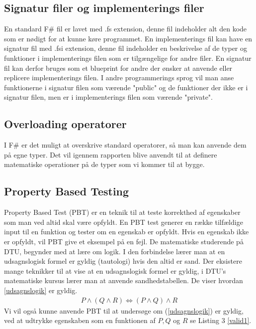 \subsection{Signatur filer og implementerings filer}
En standard F\# fil er lavet med .fs extension, denne fil indeholder alt den kode som er nødigt for at kunne køre programmet. En implementerings fil kan have en signatur fil med .fsi extension, denne fil indeholder en beskrivelse af de typer og funktioner i implementerings filen som er tilgængelige for andre filer. En signatur fil kan derfor bruges som et blueprint for andre der ønsker at anvende eller replicere implementerings filen. I andre programmerings sprog vil man anse funktionerne i signatur filen som værende "public" og de funktioner der ikke er i signatur filen, men er i implementerings filen som værende "private". 

\subsection{Overloading operatorer}
I F\# er det muligt at overskrive standard operatorer, så man kan anvende dem på egne typer. Det vil igennem rapporten blive anvendt til at definere matematiske operationer på de typer som vi kommer til at bygge.

\subsection{Property Based Testing}
Property Based Test (PBT) er en teknik til at teste korrekthed af egenskaber som man ved altid skal være opfyldt. En PBT test generer en række tilfældige input til en funktion og tester om en egenskab er opfyldt. Hvis en egenskab ikke er opfyldt, vil PBT give et eksempel på en fejl. De matematiske studerende på DTU, begynder med at lære om logik. I den forbindelse lærer man at en udsagnslogisk formel er gyldig (tautologi) hvis den altid er sand. Der eksistere mange teknikker til at vise at en udsagnslogisk formel er gyldig, i DTU's matematiske kursus lærer man at anvende sandhedstabellen. De viser hvordan \ref{udsagnslogik} er gyldig. 
\begin{gather}
    P \land (Q \land R) \iff (P \land Q) \land R
    \label{udsagnslogik}
\end{gather}
Vi vil også kunne anvende PBT til at undersøge om (\ref{udsagnslogik}) er gyldig, ved at udtrykke egenskaben som en funktionen af $P, Q$ og $R$ se Listing 3 \ref{valid1}.



